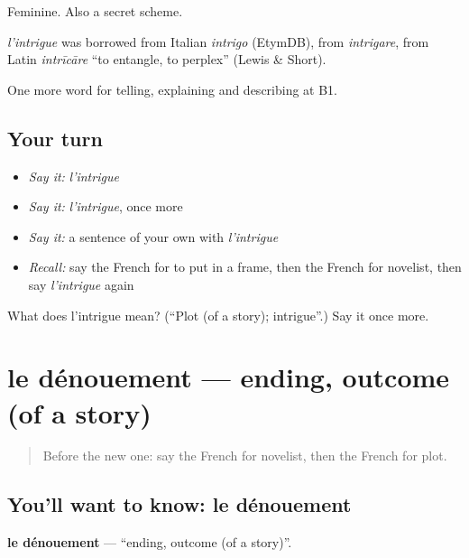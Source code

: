 Feminine. Also a secret scheme.

\begin{cousinweb}
\emph{l'intrigue} was borrowed from Italian \emph{intrigo} (EtymDB), from \emph{intrigare}, from Latin \emph{intrīcāre} \textquotedblleft{}to entangle, to perplex\textquotedblright{} (Lewis \& Short).
\end{cousinweb}

\begin{grammarlens}[title={What you've built}]
One more word for telling, explaining and describing at B1.
\end{grammarlens}

\subsection*{Your turn}
\begin{itemize}
\raggedright
  \item \emph{Say it:} \emph{l'intrigue}
  \item \emph{Say it:} \emph{l'intrigue}, once more
  \item \emph{Say it:} a sentence of your own with \emph{l'intrigue}
  \item \emph{Recall:} say the French for to put in a frame, then the French for novelist, then say \emph{l'intrigue} again
\end{itemize}

\begin{tcolorbox}[breakable,colback=teal!4,colframe=teal!35!black,title={Before you move on}]
What does l'intrigue mean? (\textquotedblleft{}Plot (of a story); intrigue\textquotedblright{}.) Say it once more.
\end{tcolorbox}
\section[le dénouement]{le dénouement — ending, outcome (of a story)}

\label{lesson:FR-C519-denouement}



\begin{quote}
Before the new one: say the French for novelist, then the French for plot.
\end{quote}

\subsection*{You'll want to know: le dénouement}
\textbf{le dénouement} — \textquotedblleft{}ending, outcome (of a story)\textquotedblright{}.

